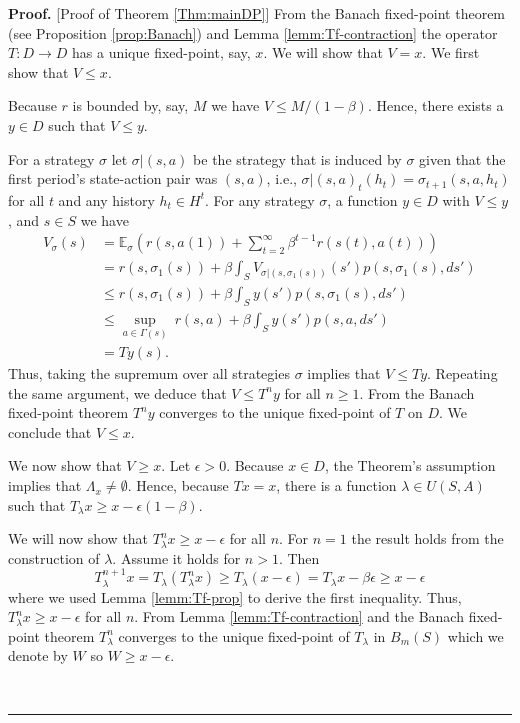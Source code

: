 \documentclass[letter,11pt]{article}
\newenvironment {proof}[1][Proof]{\noindent \textbf {#1.} }{\ \rule {0.5em}{0.5em}}
\begin{document}
\begin{proof} [Proof of Theorem \ref{Thm:mainDP}]
From the Banach fixed-point theorem (see Proposition \ref{prop:Banach}) and Lemma \ref{lemm:Tf-contraction} the operator $T:D \rightarrow D$ has a unique fixed-point, say, $x$. We will show that $V=x$.  We first show that $V \leq x$. 

 Because $r$ is bounded by, say, $M$ we have $ V \leq M/(1-\beta)$. Hence, there exists a $y \in D $ such that $V \leq y$. 



 For a strategy $\sigma$ let $\sigma | (s,a)$ be the strategy that is induced by $\sigma$ given that the first period's state-action pair was $(s,a)$, i.e., $\sigma | (s,a) _{t} (h_{t}) = \sigma _{t+1} (s,a,h_{t}) $ for all $t$ and any history $h_{t} \in H^{t}$.  
For any strategy $\sigma$, a function $y \in D$ with $V \leq y$, and $s \in S$ we have 
\begin{align*}
    V_{\sigma}(s) & = \mathbb{E}_{\sigma } \left ( r(s,a(1)) + \sum \limits_{t =2}^{\infty }\beta^{t -1}r(s(t),a(t)) \right )   \\
    & = r(s,\sigma_{1}(s)) + \beta \int _{S} V_{\sigma | (s,\sigma_{1}(s))} (s') p(s, \sigma_{1}(s),ds') \\
    & \leq  r(s,\sigma_{1}(s)) + \beta \int _{S} y (s') p(s, \sigma_{1}(s),ds') \\
    & \leq \sup _{a \in \Gamma(s)} \ r(s,a) + \beta \int _{S} y (s') p(s, a,ds') \\
    & = Ty(s). 
\end{align*}
   Thus, taking the supremum over all strategies $\sigma$ implies that $V \leq Ty$.  Repeating the same argument, we deduce that $V \leq T^{n}y$ for all $n \geq 1$. From the Banach fixed-point theorem $T^{n}y$ converges to the unique fixed-point of $T$ on $D$. We conclude that $V \leq x$.  

We now show that $V \geq x$. 
   Let $\epsilon >0$. Because $x \in D$, the Theorem's assumption implies that $\Lambda_{x} \neq \emptyset $. Hence, because $Tx=x$, there is a function $\lambda \in U(S,A)$ such that $T_{\lambda}x \geq x - \epsilon(1-\beta) $. 
   
   We will now show that $T_{\lambda}^{n}x \geq x - \epsilon$ for all $n$. For $n=1$ the result holds from the construction of $\lambda$. Assume it holds for $n>1$. Then 
   $$ T_{\lambda}^{n+1}x = T_{\lambda} (T_{\lambda}^{n}x) \geq T_{\lambda} (x - \epsilon) = T_{\lambda}x - \beta \epsilon \geq  x - \epsilon$$
   where we used Lemma \ref{lemm:Tf-prop} to derive the first inequality. 
Thus, $T_{\lambda}^{n}x \geq x - \epsilon$ for all $n$. From Lemma \ref{lemm:Tf-contraction}  and the Banach fixed-point theorem  
 $T_{\lambda}^{n}$ converges to the unique fixed-point of $T_{\lambda}$ in $B_{m}(S)$ which we denote by $W$ so $W \geq x - \epsilon$. 
 

\end{proof}
\end{document}
